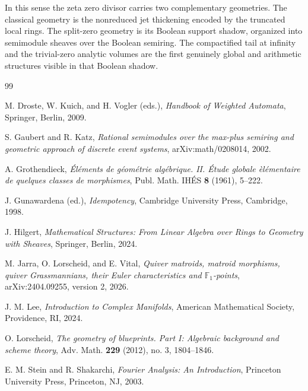 \documentclass[11pt,a4paper]{article}
\theoremstyle{definition}
\theoremstyle{remark}
\begin{document}
In this sense the zeta zero divisor carries two complementary geometries.  The classical geometry is the nonreduced jet thickening encoded by the truncated local rings.  The split-zero geometry is its Boolean support shadow, organized into semimodule sheaves over the Boolean semiring.  The compactified tail at infinity and the trivial-zero analytic volumes are the first genuinely global and arithmetic structures visible in that Boolean shadow.

\begin{thebibliography}{99}

M. Droste, W. Kuich, and H. Vogler (eds.),
\emph{Handbook of Weighted Automata},
Springer, Berlin, 2009.

S. Gaubert and R. Katz,
\emph{Rational semimodules over the max-plus semiring and geometric approach of discrete event systems},
arXiv:math/0208014, 2002.

A. Grothendieck,
\emph{\'El\'ements de g\'eom\'etrie alg\'ebrique. II. \'Etude globale \`el\'ementaire de quelques classes de morphismes},
Publ. Math. IH\'ES \textbf{8} (1961), 5--222.

J. Gunawardena (ed.),
\emph{Idempotency},
Cambridge University Press, Cambridge, 1998.

J. Hilgert,
\emph{Mathematical Structures: From Linear Algebra over Rings to Geometry with Sheaves},
Springer, Berlin, 2024.

M. Jarra, O. Lorscheid, and E. Vital,
\emph{Quiver matroids, matroid morphisms, quiver Grassmannians, their Euler characteristics and $\mathbb F_1$-points},
arXiv:2404.09255, version 2, 2026.

J. M. Lee,
\emph{Introduction to Complex Manifolds},
American Mathematical Society, Providence, RI, 2024.

O. Lorscheid,
\emph{The geometry of blueprints. Part I: Algebraic background and scheme theory},
Adv. Math. \textbf{229} (2012), no. 3, 1804--1846.

E. M. Stein and R. Shakarchi,
\emph{Fourier Analysis: An Introduction},
Princeton University Press, Princeton, NJ, 2003.

\end{thebibliography}
\end{document}
